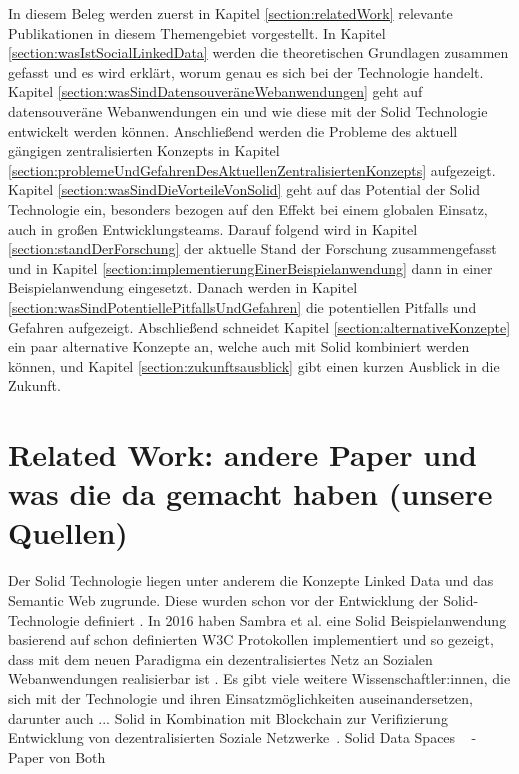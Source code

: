 \documentclass[acmtog]{acmart}
\begin{document}
In diesem Beleg werden zuerst in Kapitel \ref{section:relatedWork} relevante Publikationen in diesem Themengebiet vorgestellt. In Kapitel \ref{section:wasIstSocialLinkedData} werden die theoretischen Grundlagen zusammen gefasst und es wird erklärt, worum genau es sich bei der Technologie handelt. Kapitel \ref{section:wasSindDatensouveräneWebanwendungen} geht auf datensouveräne Webanwendungen ein und wie diese mit der Solid Technologie entwickelt werden können. Anschließend werden die Probleme des aktuell gängigen zentralisierten Konzepts in Kapitel \ref{section:problemeUndGefahrenDesAktuellenZentralisiertenKonzepts} aufgezeigt. Kapitel \ref{section:wasSindDieVorteileVonSolid} geht auf das Potential der Solid Technologie ein, besonders bezogen auf den Effekt bei einem globalen Einsatz, auch in großen Entwicklungsteams. Darauf folgend wird in Kapitel \ref{section:standDerForschung} der aktuelle Stand der Forschung zusammengefasst und in Kapitel \ref{section:implementierungEinerBeispielanwendung} dann in einer Beispielanwendung eingesetzt. Danach werden in Kapitel \ref{section:wasSindPotentiellePitfallsUndGefahren} die potentiellen Pitfalls und Gefahren aufgezeigt. Abschließend schneidet Kapitel \ref{section:alternativeKonzepte} ein paar alternative Konzepte an, welche auch mit Solid kombiniert werden können, und Kapitel \ref{section:zukunftsausblick} gibt einen kurzen Ausblick in die Zukunft.

\label{section:relatedWork}
\section{Related Work: andere Paper und was die da gemacht haben (unsere Quellen)}

Der Solid Technologie liegen unter anderem die Konzepte Linked Data und das Semantic Web zugrunde. Diese wurden schon vor der Entwicklung der Solid-Technologie definiert \cite{blumauer2006semantic}.
In 2016 haben Sambra et al. eine Solid Beispielanwendung basierend auf schon definierten W3C Protokollen implementiert und so gezeigt, dass mit dem neuen Paradigma ein dezentralisiertes Netz an Sozialen Webanwendungen realisierbar ist \cite{sambra2016solid}.
Es gibt viele weitere Wissenschaftler:innen, die sich mit der Technologie und ihren Einsatzmöglichkeiten auseinandersetzen, darunter auch ...
Solid in Kombination mit Blockchain zur Verifizierung ~\cite{ramachandran2020towards}
Entwicklung von dezentralisierten Soziale Netzwerke~\cite{yeung2023decentralization}.
Solid Data Spaces ~\cite{meckler2023web}
- Paper von Both 
\end{document}
